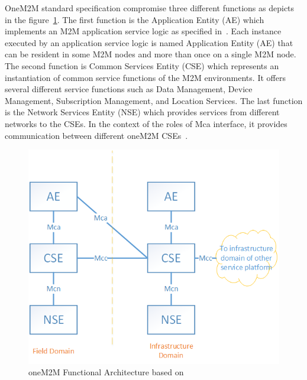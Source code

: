 OneM2M standard specification compromise three different functions as depicts in the figure~\ref{fig:contrib1:goal}. The first function is the Application Entity (AE) which implements an M2M application service logic as specified in~\cite{onem2marchi}. Each instance executed by an application service logic is named Application Entity (AE) that can be resident in some M2M nodes and more than once on a single M2M node. The second function is Common Services Entity (CSE) which represents an instantiation of common service functions of the M2M environments. It offers several different service functions such as Data Management, Device Management, Subscription Management, and Location Services. The last function is the Network Services Entity (NSE) which provides services from different networks to the CSEs. In the context of the roles of Mca interface, it provides communication between different oneM2M CSEs~\cite{onem2marchi}.
\par
\begin{figure}[htbp]
    \centering
    \includegraphics[width=.8\textwidth]{resources/images/arch}
    \caption{oneM2M Functional Architecture based on }\label{fig:contrib1:goal}
\end{figure}\par
